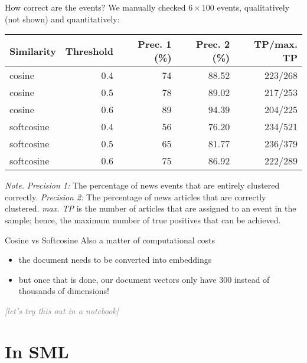 \documentclass[compress]{beamer}
\newcommand{\instruction}[1]{\emph{\textcolor{gray}{[#1]}}}
\begin{document}
\begin{frame}[fragile]{How correct are the events?}
	We manually checked $6 \times 100$ events, qualitatively (not shown) and quantitatively:
	\begin{table}
	\begin{tabular}{lrrrr}
		\footnotesize
		\textbf{Similarity}   & \textbf{Threshold} & \textbf{Prec. 1 (\%)} & \textbf{Prec. 2 (\%)} &\textbf{TP/max. TP}  \\
		\midrule
		cosine              & 0.4       & 74        & 88.52     & 223/268 \\
		cosine              & 0.5       & 78        & 89.02     & 217/253 \\
		cosine              & 0.6       & 89        & 94.39     & 204/225 \\
		softcosine          & 0.4       & 56        & 76.20     & 234/521 \\
		softcosine          & 0.5       & 65        & 81.77     & 236/379 \\
		softcosine          & 0.6       & 75        & 86.92     & 222/289 \\

	\end{tabular}
	\end{table}
\tiny 
	\textit{Note.} \textit{Precision 1:} The percentage of news events that are entirely clustered correctly. \textit{Precision 2:} The percentage of news articles that are correctly clustered. \textit{max. TP} is the number of articles that are assigned to an event in the sample; hence, the maximum number of true positives that can be achieved.\\
	
\end{frame}

\begin{frame}{Cosine vs Softcosine}
	Also a matter of computational costs
\begin{itemize}
	\item the document needs to be converted into embeddings
	\item but once that is done, our document vectors only have 300 instead of thousands of dimensions!
\end{itemize}
\end{frame}

\begin{frame}[plain]
\instruction{let's try this out in a notebook}
\end{frame}


\section{In SML}
\end{document}
